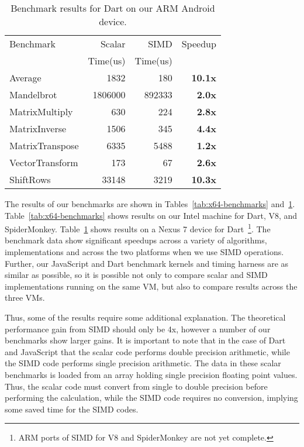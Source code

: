 \documentclass{sigplanconf}
\begin{document}
\begin{table}
\begin{center}
\begin{tabular}{|l|r|r|r|}
\hline
Benchmark & Scalar   & SIMD     & Speedup \\
          & Time(us) & Time(us) &         \\
\hline
\hline
Average & 1832 & 180 & \textbf{10.1x} \\
\hline
Mandelbrot & 1806000 & 892333 & \textbf{2.0x} \\
\hline
MatrixMultiply & 630 & 224 & \textbf{2.8x} \\
\hline
MatrixInverse & 1506 & 345 & \textbf{4.4x} \\
\hline
MatrixTranspose & 6335 & 5488 & \textbf{1.2x} \\
\hline
VectorTransform & 173 & 67 & \textbf{2.6x} \\
\hline
ShiftRows & 33148 & 3219 & \textbf{10.3x} \\
\hline
\end{tabular}
\end{center}
\caption{Benchmark results for Dart on our ARM Android device.}
\label{tab:arm-benchmarks}
\end{table}


The results of our benchmarks are shown in Tables~\ref{tab:x64-benchmarks}
and~\ref{tab:arm-benchmarks}.
%
Table~\ref{tab:x64-benchmarks} shows results on our Intel machine for Dart, V8,
and SpiderMonkey.
%
Table~\ref{tab:arm-benchmarks} shows results on a Nexus 7 device for
Dart~\footnote{ARM ports of SIMD for V8 and SpiderMonkey are not yet complete.}.
%
The benchmark data show significant speedups across a variety of algorithms,
implementations and across the two platforms when we use SIMD operations.
%
Further, our JavaScript and Dart benchmark kernels and timing harness are as
similar as possible, so it is possible not only to compare scalar and SIMD
implementations running on the same VM, but also to compare results across the
three VMs.


Thus, some of the results require some additional explanation.
%
The theoretical performance gain from SIMD should only be 4x, however a number
of our benchmarks show larger gains.
%
It is important to note that in the case of Dart and JavaScript that the scalar
code performs double precision arithmetic, while the SIMD code
performs single precision arithmetic.
%
The data in these scalar benchmarks is loaded from an array holding single
precision floating point values.
%
Thus, the scalar code must convert from single to double precision before
performing the calculation, while the SIMD code requires no conversion,
implying some saved time for the SIMD codes.
\end{document}

